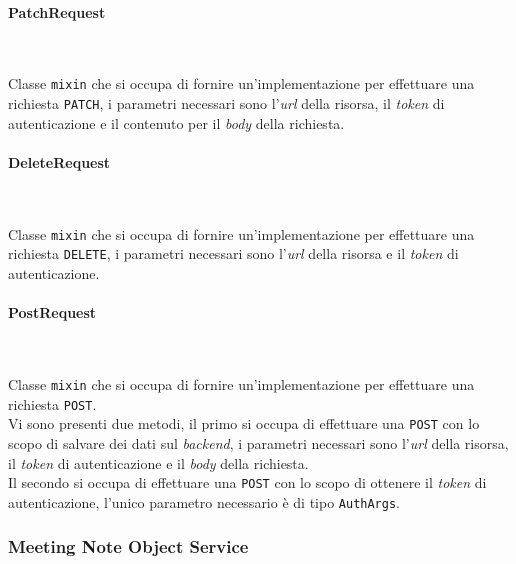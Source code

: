 \paragraph*{PatchRequest} ~ \\
\label{par:patch-request}

\noindent Classe \lstinline{mixin} che si occupa di fornire un'implementazione per effettuare una richiesta \lstinline{PATCH}, i parametri necessari sono l'\emph{url} della risorsa, il \emph{token} di autenticazione e il contenuto per il \emph{body} della richiesta.

\paragraph*{DeleteRequest} ~ \\
\label{par:delete-request}

\noindent Classe \lstinline{mixin} che si occupa di fornire un'implementazione per effettuare una richiesta \lstinline{DELETE}, i parametri necessari sono l'\emph{url} della risorsa e il \emph{token} di autenticazione.

\paragraph*{PostRequest} ~ \\
\label{par:post-request}

\noindent Classe \lstinline{mixin} che si occupa di fornire un'implementazione per effettuare una richiesta \lstinline{POST}. \\
Vi sono presenti due metodi, il primo si occupa di effettuare una \lstinline{POST} con lo scopo di salvare dei dati sul \emph{backend}, i parametri necessari sono l'\emph{url} della risorsa, il \emph{token} di autenticazione e il \emph{body} della richiesta. \\
Il secondo si occupa di effettuare una \lstinline{POST} con lo scopo di ottenere il \emph{token} di autenticazione, l'unico parametro necessario è di tipo \lstinline{AuthArgs}.

\subsubsection*{Meeting Note Object Service}
\label{subsubsec:meeting-note-object-service}

